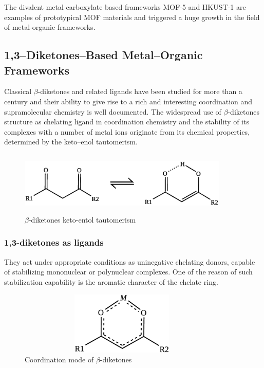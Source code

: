 \documentclass[../Master.tex]{subfiles}
\begin{document}
The divalent metal carboxylate based frameworks MOF-5 and HKUST-1 are examples of prototypical MOF materials and triggered a huge growth in the field of metal-organic frameworks.

\subsection{1,3–Diketones–Based Metal–Organic Frameworks}\label{dk-mof}
Classical \(\beta\)-diketones and related ligands have been studied for more than a century and their ability to give rise to a rich and interesting coordination and supramolecular chemistry is well documented\cite{aromi_poly_2008}. The widespread use of \(\beta\)-diketones structure as chelating ligand in coordination chemistry and the stability of its complexes with a number of metal ions originate from its chemical properties, determined by the keto–enol tautomerism.

\begin{figure}[h!]
	\centering
	\includegraphics[width=10cm,height=3cm,keepaspectratio]{Structures/diktau.eps}
	\caption{\(\beta\)-diketones keto-entol tautomerism}\label{fig:diktau}
\end{figure}

\subsubsection{1,3-diketones as ligands}
They act under appropriate conditions as uninegative chelating donors, capable of stabilizing mononuclear or polynuclear complexes. One of the reason of such stabilization capability is the aromatic character of the chelate ring.
\begin{figure}[h]
	\centering
	\includegraphics[width=10cm,height=3cm,keepaspectratio]{Structures/dikcordmode.eps}
	\caption{Coordination mode of $\beta$-diketones}\label{fig:diktaucordmode}
\end{figure}
\end{document}
